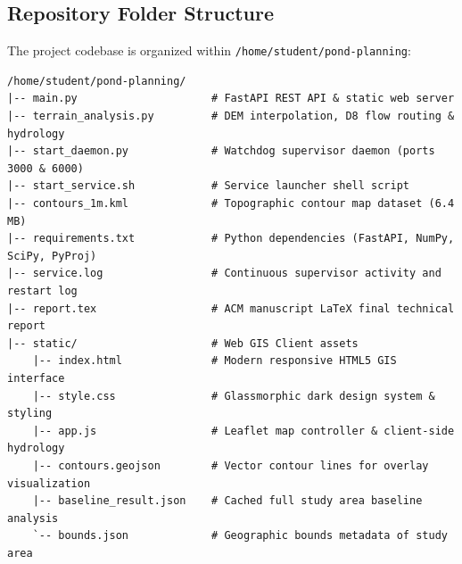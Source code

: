 \documentclass[manuscript,screen,review]{acmart}
\begin{document}
\subsection{Repository Folder Structure}
The project codebase is organized within \texttt{/home/student/pond-planning}:
\begin{verbatim}
/home/student/pond-planning/
|-- main.py                     # FastAPI REST API & static web server
|-- terrain_analysis.py         # DEM interpolation, D8 flow routing & hydrology
|-- start_daemon.py             # Watchdog supervisor daemon (ports 3000 & 6000)
|-- start_service.sh            # Service launcher shell script
|-- contours_1m.kml             # Topographic contour map dataset (6.4 MB)
|-- requirements.txt            # Python dependencies (FastAPI, NumPy, SciPy, PyProj)
|-- service.log                 # Continuous supervisor activity and restart log
|-- report.tex                  # ACM manuscript LaTeX final technical report
|-- static/                     # Web GIS Client assets
    |-- index.html              # Modern responsive HTML5 GIS interface
    |-- style.css               # Glassmorphic dark design system & styling
    |-- app.js                  # Leaflet map controller & client-side hydrology
    |-- contours.geojson        # Vector contour lines for overlay visualization
    |-- baseline_result.json    # Cached full study area baseline analysis
    `-- bounds.json             # Geographic bounds metadata of study area
\end{verbatim}
\end{document}

